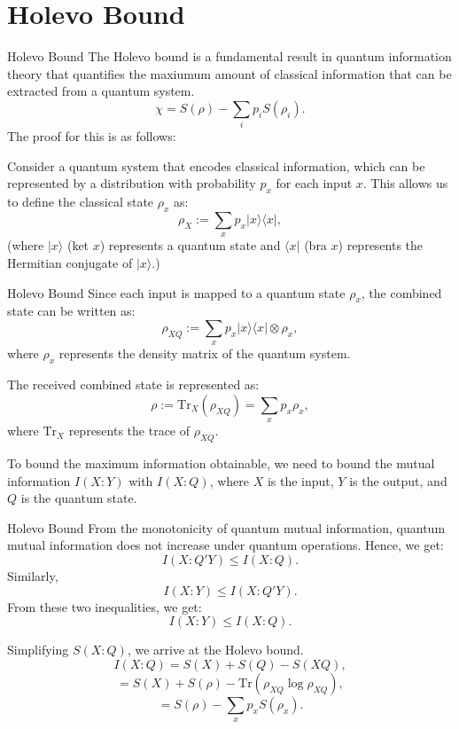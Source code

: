 \section{Holevo Bound}

\begin{frame}{Holevo Bound}
The Holevo bound is a fundamental result in quantum information theory that quantifies the maxiumum amount of classical information that can be extracted from a quantum system.
\[
\chi = S(\rho) - \sum_i p_i S(\rho_i).
\]
The proof for this is as follows:

Consider a quantum system that encodes classical information, which can be represented by a distribution with probability $p_x$ for each input $x$. This allows us to define the classical state $\rho_x$ as:
\[
\rho_X := \sum_x p_x \lvert x \rangle \langle x \rvert,
\]
(where $\lvert x \rangle$ (ket $x$) represents a quantum state and $\langle x \rvert$ (bra $x$) represents the Hermitian conjugate of $\lvert x \rangle$.)
\end{frame}

\begin{frame}{Holevo Bound}
    Since each input is mapped to a quantum state $\rho_x$, the combined state can be written as:
\[
\rho_{XQ} := \sum_x p_x \lvert x \rangle \langle x \rvert \otimes \rho_x,
\]
where $\rho_x$ represents the density matrix of the quantum system.

The received combined state is represented as:
\[
\rho := \text{Tr}_X (\rho_{XQ}) = \sum_x p_x \rho_x,
\]
where $\text{Tr}_X$ represents the trace of $\rho_{XQ}$.

To bound the maximum information obtainable, we need to bound the mutual information $I(X : Y)$ with $I(X : Q)$, where $X$ is the input, $Y$ is the output, and $Q$ is the quantum state.
\end{frame}

\begin{frame}{Holevo Bound}
From the monotonicity of quantum mutual information, quantum mutual information does not increase under quantum operations. Hence, we get:
\[
I(X : Q'Y) \leq I(X : Q).
\]
Similarly,
\[
I(X : Y) \leq I(X : Q'Y).
\]
From these two inequalities, we get:
\[
I(X : Y) \leq I(X : Q).
\]

Simplifying $S(X : Q)$, we arrive at the Holevo bound.
\[
I(X : Q) = S(X) + S(Q) - S(XQ),
\]
\[
= S(X) + S(\rho) - \text{Tr}(\rho_{XQ} \log \rho_{XQ}),
\]
\[
= S(\rho) - \sum_x p_x S(\rho_x).
\]
\end{frame}
